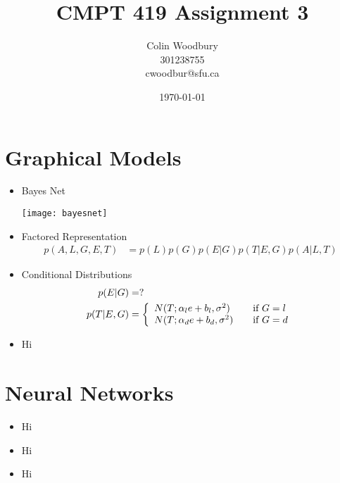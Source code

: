 \documentclass{article}
\begin{document}
\title{CMPT 419 Assignment 3}
\author{Colin Woodbury\\ 301238755\\ cwoodbur@sfu.ca}
\date{\today}
\maketitle

\tableofcontents
\clearpage

\section{Graphical Models}

\begin{itemize}
\item Bayes Net
  \begin{center}
    \texttt{[image: bayesnet]}
  \end{center}

\item Factored Representation
  \begin{align*}
    p(A,L,G,E,T) &= p(L)p(G)p(E|G)p(T|E,G)p(A|L,T)
  \end{align*}

\item Conditional Distributions
  \begin{align*}
    p(E|G) &= ?\\
    p(T|E,G) &= \left\{
    \begin{array}{l l}
      N(T; \alpha_l e + b_l, \sigma^2) & \quad \text{if $G = l$}\\
      N(T; \alpha_d e + b_d, \sigma^2) & \quad \text{if $G = d$}\\
    \end{array} \right.
  \end{align*}
  
\item Hi
\end{itemize}

\section{Neural Networks}

\begin{itemize}
\item Hi
\item Hi
\item Hi
\end{itemize}
\end{document}
